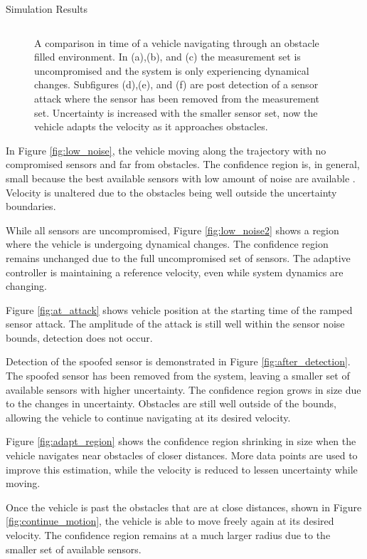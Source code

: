 \begin{section}{Simulation Results}
\begin{figure}[b!th]
\begin{tabular}{ccc}
\end{tabular}
\caption{A comparison in time of a vehicle navigating through an obstacle filled environment. In (a),(b), and (c) the measurement set is uncompromised and the system is only experiencing dynamical changes. Subfigures (d),(e), and (f) are post detection of a sensor attack where the sensor has been removed from the measurement set. Uncertainty is increased with the smaller sensor set, now the vehicle adapts the velocity as it approaches obstacles.}

\end{figure}

In Figure \ref{fig:low_noise}, the vehicle moving along the trajectory with no compromised sensors and far from obstacles. The confidence region is, in general, small because the best available sensors with low amount of noise are available . Velocity is unaltered due to the obstacles being well outside the uncertainty boundaries.

While all sensors are uncompromised, Figure \ref{fig:low_noise2} shows a region where the vehicle is undergoing dynamical changes. The confidence region remains unchanged due to the full uncompromised set of sensors. The adaptive controller is maintaining a reference velocity, even while system dynamics are changing.

Figure \ref{fig:at_attack} shows vehicle position at the starting time of the ramped sensor attack. The amplitude of the attack is still well within the sensor noise bounds, detection does not occur.


Detection of the spoofed sensor is demonstrated in Figure \ref{fig:after_detection}. The spoofed sensor has been removed from the system, leaving a smaller set of available sensors with higher uncertainty. The confidence region grows in size due to the changes in uncertainty. Obstacles are still well outside of the bounds, allowing the vehicle to continue navigating at its desired velocity.

Figure \ref{fig:adapt_region} shows the confidence region shrinking in size when the vehicle navigates near obstacles of closer distances. More data points are used to improve this estimation, while the velocity is reduced to lessen uncertainty while moving.

Once the vehicle is past the obstacles that are at close distances, shown in Figure \ref{fig:continue_motion}, the vehicle is able to move freely again at its desired velocity. The confidence region remains at a much larger radius due to the smaller set of available sensors.




\end{section}
